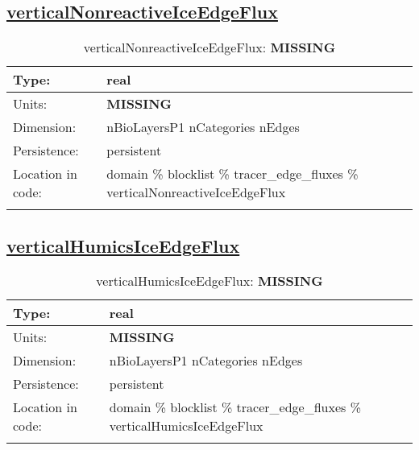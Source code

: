 \subsection[verticalNonreactiveIceEdgeFlux]{\hyperref[sec:var_tab_tracer_edge_fluxes]{verticalNonreactiveIceEdgeFlux}}
\label{subsec:var_sec_tracer_edge_fluxes_verticalNonreactiveIceEdgeFlux}
\begin{center}
\begin{longtable}{| p{2.0in} | p{4.0in} |}
        \hline 
        Type: & real \\
        \hline 
        Units: & {\bf \color{red} MISSING} \\
        \hline 
        Dimension: & nBioLayersP1 nCategories nEdges \\
        \hline 
        Persistence: & persistent \\
        \hline 
         Location in code: & domain \% blocklist \% tracer\_edge\_fluxes \% verticalNonreactiveIceEdgeFlux \\
         \hline 
    \caption{verticalNonreactiveIceEdgeFlux: {\bf \color{red} MISSING}}
\end{longtable}
\end{center}
\subsection[verticalHumicsIceEdgeFlux]{\hyperref[sec:var_tab_tracer_edge_fluxes]{verticalHumicsIceEdgeFlux}}
\label{subsec:var_sec_tracer_edge_fluxes_verticalHumicsIceEdgeFlux}
\begin{center}
\begin{longtable}{| p{2.0in} | p{4.0in} |}
        \hline 
        Type: & real \\
        \hline 
        Units: & {\bf \color{red} MISSING} \\
        \hline 
        Dimension: & nBioLayersP1 nCategories nEdges \\
        \hline 
        Persistence: & persistent \\
        \hline 
         Location in code: & domain \% blocklist \% tracer\_edge\_fluxes \% verticalHumicsIceEdgeFlux \\
         \hline 
    \caption{verticalHumicsIceEdgeFlux: {\bf \color{red} MISSING}}
\end{longtable}
\end{center}
